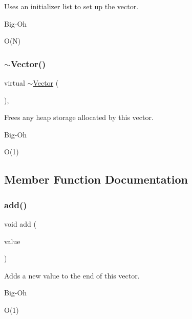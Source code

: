 Uses an initializer list to set up the vector. 

\begin{DoxyRefDesc}{Big-\/\+Oh}
\item[\mbox{\hyperlink{BigOh__BigOh000101}{Big-\/\+Oh}}]O(\+N) \end{DoxyRefDesc}
\mbox{\label{classVector_a46f51c573db980ae2ae366dba3daf53d}} 
\subsubsection{\texorpdfstring{$\sim$\+Vector()}{~Vector()}}
{\footnotesize\ttfamily virtual $\sim$\mbox{\hyperlink{classVector}{Vector}} (\begin{DoxyParamCaption}{ }\end{DoxyParamCaption})\hspace{0.3cm}{\ttfamily [virtual]}, {\ttfamily [default]}}



Frees any heap storage allocated by this vector. 

\begin{DoxyRefDesc}{Big-\/\+Oh}
\item[\mbox{\hyperlink{BigOh__BigOh000102}{Big-\/\+Oh}}]O(1) \end{DoxyRefDesc}


\subsection{Member Function Documentation}
\mbox{\label{classVector_ab901606bf3a8019c986f0cf9a9f298dc}} 
\subsubsection{\texorpdfstring{add()}{add()}}
{\footnotesize\ttfamily void add (\begin{DoxyParamCaption}\item[{const Value\+Type \&}]{value }\end{DoxyParamCaption})}



Adds a new value to the end of this vector. 

\begin{DoxyRefDesc}{Big-\/\+Oh}
\item[\mbox{\hyperlink{BigOh__BigOh000103}{Big-\/\+Oh}}]O(1) \end{DoxyRefDesc}
\mbox{\label{classVector_a7e05c14d67a60defeb6723b5704967a6}} 
